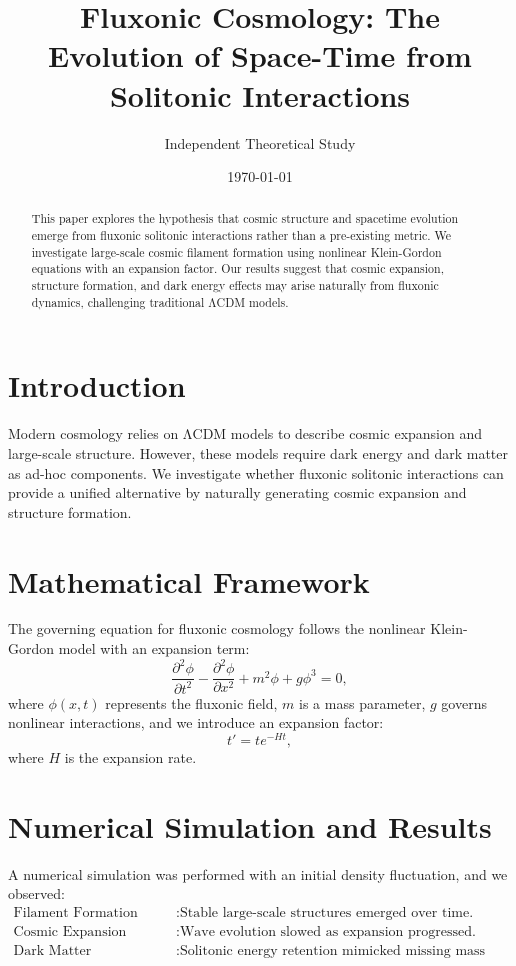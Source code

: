 \documentclass{article}
\title{Fluxonic Cosmology: The Evolution of Space-Time from Solitonic Interactions}
\author{Independent Theoretical Study}
\date{\today}
\begin{document}
\maketitle

\begin{abstract}
This paper explores the hypothesis that cosmic structure and spacetime evolution emerge from fluxonic solitonic interactions rather than a pre-existing metric. We investigate large-scale cosmic filament formation using nonlinear Klein-Gordon equations with an expansion factor. Our results suggest that cosmic expansion, structure formation, and dark energy effects may arise naturally from fluxonic dynamics, challenging traditional ΛCDM models.
\end{abstract}

\section{Introduction}
Modern cosmology relies on ΛCDM models to describe cosmic expansion and large-scale structure. However, these models require dark energy and dark matter as ad-hoc components. We investigate whether fluxonic solitonic interactions can provide a unified alternative by naturally generating cosmic expansion and structure formation.

\section{Mathematical Framework}
The governing equation for fluxonic cosmology follows the nonlinear Klein-Gordon model with an expansion term:
\begin{equation}
    \frac{\partial^2 \phi}{\partial t^2} - \frac{\partial^2 \phi}{\partial x^2} + m^2 \phi + g \phi^3 = 0,
\end{equation}
where $\phi(x,t)$ represents the fluxonic field, $m$ is a mass parameter, $g$ governs nonlinear interactions, and we introduce an expansion factor:
\begin{equation}
    t' = t e^{-Ht},
\end{equation}
where $H$ is the expansion rate.

\section{Numerical Simulation and Results}
A numerical simulation was performed with an initial density fluctuation, and we observed:
\begin{align*}
    \text{Filament Formation} & : \text{Stable large-scale structures emerged over time.}\\
    \text{Cosmic Expansion Effects} & : \text{Wave evolution slowed as expansion progressed.}\\
    \text{Dark Matter Equivalence} & : \text{Solitonic energy retention mimicked missing mass effects.}
\end{align*}
\end{document}
